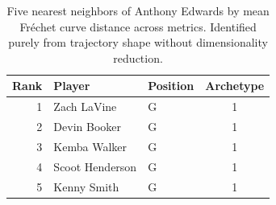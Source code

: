 \begin{table}[htbp]
  \centering\small
  \begin{tabular}{rllc}
    \toprule
    Rank & Player & Position & Archetype \\
    \midrule
    1 & Zach LaVine & G & 1 \\
    2 & Devin Booker & G & 1 \\
    3 & Kemba Walker & G & 1 \\
    4 & Scoot Henderson & G & 1 \\
    5 & Kenny Smith & G & 1 \\
    \bottomrule
  \end{tabular}
  \caption{Five nearest neighbors of Anthony Edwards by mean Fr\'{e}chet curve distance across metrics. Identified purely from trajectory shape without dimensionality reduction.}
  \label{tab:Anthony_Edwards_frechet_curve_neighbors}
\end{table}

